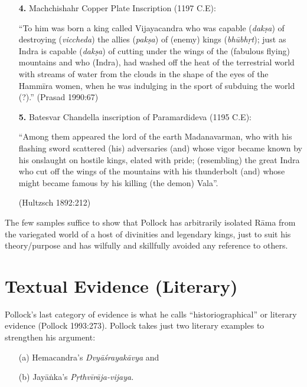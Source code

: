 \begin{itemize}
\item[{\bf 4.}] Machchishahr Copper Plate Inscription (1197 C.E): 

“To him was born a king called Vijayacandra who was capable ({\sl dakṣa}) of destroying ({\sl viccheda}) the allies ({\sl pakṣa}) of (enemy) kings ({\sl bhūbhṛt}); just as Indra is capable ({\sl dakṣa}) of cutting under the wings of the (fabulous flying) mountains and who (Indra), had washed off the heat of the terrestrial world with streams of water from the clouds in the shape of the eyes of the Hammīra women, when he was indulging in the sport of subduing the world (?).”
\hfill (Prasad 1990:67)

\item[{\bf 5.}] Batesvar Chandella inscription of Paramardideva (1195 C.E): 

“Among them appeared the lord of the earth Madanavarman, who with his flashing sword scattered (his) adversaries (and) whose vigor became known by his onslaught on hostile kings, elated with pride; (resembling) the great Indra who cut off the wings of the mountains with his thunderbolt (and) whose might became famous by his killing (the demon) Vala”.

\hfill (Hultzsch 1892:212)
\end{itemize}

The few samples suffice to show that Pollock has arbitrarily isolated Rāma from the variegated world of a host of divinities and legendary kings, just to suit his theory/purpose and has wilfully and skillfully avoided any reference to others.

\section{Textual Evidence (Literary)}\label{sec3.3}

Pollock’s last category of evidence is what he calls “historiographical” or literary evidence (Pollock 1993:273). Pollock takes just two literary examples to strengthen his argument: 
\begin{itemize}
\itemsep=1pt
\item[(a)] Hemacandra’s {\sl Dvyāśrayakāvya} and
\item[(b)] Jayāṅka’s {\sl Pṛthvīrāja-vijaya.}
\end{itemize}

